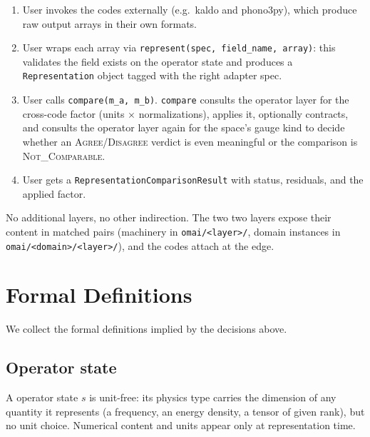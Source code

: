 \documentclass[11pt,a4paper]{article}
\begin{document}
\begin{enumerate}[leftmargin=2em, itemsep=0.2em]
  \item User invokes the codes externally (e.g.\ kaldo and phono3py),
        which produce raw output arrays in their own formats.
  \item User wraps each array via \texttt{represent(spec, field\_name,
        array)}: this validates the field exists on the operator state
        and produces a \texttt{Representation} object tagged with the
        right adapter spec.
  \item User calls \texttt{compare(m\_a, m\_b)}. \texttt{compare} consults
        the operator layer for the cross-code factor (units \(\times\)
        normalizations), applies it, optionally contracts, and consults the
        operator layer again for the space's gauge kind to decide whether
        an \textsc{Agree}/\textsc{Disagree} verdict is even meaningful or
        the comparison is \textsc{Not\_Comparable}.
  \item User gets a \texttt{RepresentationComparisonResult} with status, residuals,
        and the applied factor.
\end{enumerate}

\noindent No additional layers, no other indirection. The two
two layers expose their content in matched pairs (machinery
in \texttt{omai/<layer>/}, domain instances in
\texttt{omai/<domain>/<layer>/}), and the codes attach at the edge.

\medskip

\section{Formal Definitions}
\label{sec:defs}

We collect the formal definitions implied by the decisions above.

\subsection{Operator state}

A operator state $s$ is unit-free: its physics type carries the dimension of any
quantity it represents (a frequency, an energy density, a tensor of given rank), but no
unit choice. Numerical content and units appear only at representation time.

\medskip
\end{document}
